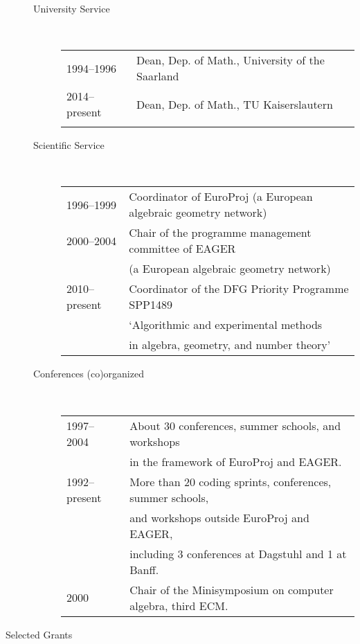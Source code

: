 \begin{description}
\begin{description}
\item[University Service]\ 

\begin{tabular}{ll}
 1994--1996 & Dean, Dep. of Math., University of the Saarland\\
  2014--present & Dean, Dep. of Math., TU Kaiserslautern\\
\phantom{A}
 \end{tabular}

\item[Scientific Service]\ 

\begin{tabular}{ll}
 1996--1999 & Coordinator of EuroProj (a European algebraic geometry network)\\
 2000--2004 & Chair of the programme management committee of EAGER\\ 
                      &  (a European algebraic geometry network)\\
 2010--present & Coordinator of the DFG Priority Programme SPP1489\\
                      & `Algorithmic and experimental methods\\
                      & in algebra, geometry, and number theory'\\
\end{tabular}

\item[Conferences (co)organized]\ 

\begin{tabular}{ll}
 1997-- 2004 & About 30 conferences, summer schools, and workshops\\ 
                           & in the framework of EuroProj and EAGER.\\
 1992--present & More than 20 coding sprints, conferences, summer schools,\\
                          & and workshops outside EuroProj and EAGER,\\
                          & including 3 conferences at Dagstuhl and 1 at Banff.\\
 2000                 & Chair of the Minisymposium on computer algebra, third ECM.\\
\end{tabular}
\end{description}

\item[Selected Grants]\ 


\end{description}
